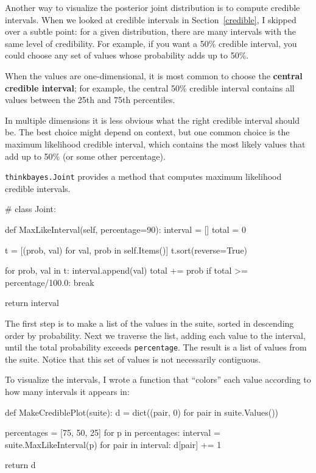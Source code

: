 \documentclass[12pt]{book}
\theoremstyle{exercise}
\begin{document}
Another way to visualize the posterior joint distribution is to
compute credible intervals.  When we looked at credible intervals
in Section~\ref{credible},
I skipped over a subtle point: for a given distribution, there
are many intervals with the same level of credibility.  For example,
if you want a 50\% credible interval, you could choose any set of
values whose probability adds up to 50\%.

When the values are one-dimensional, it is most common to choose
the {\bf central credible interval}; for example, the central 50\%
credible interval contains all values between the 25th and 75th
percentiles.

In multiple dimensions it is less obvious what the right credible
interval should be.  The best choice might depend on context, but
one common choice is the maximum likelihood credible interval, which
contains the most likely values that add up to 50\% (or some other
percentage).

{\tt thinkbayes.Joint} provides a method that computes maximum
likelihood credible intervals. 

\begin{code}
# class Joint:

    def MaxLikeInterval(self, percentage=90):
        interval = []
        total = 0

        t = [(prob, val) for val, prob in self.Items()]
        t.sort(reverse=True)

        for prob, val in t:
            interval.append(val)
            total += prob
            if total >= percentage/100.0:
                break

        return interval
\end{code}

The first step is to make a list of the values in the suite,
sorted in descending order by probability.  Next we traverse the
list, adding each value to the interval, until the total
probability exceeds {\tt percentage}.  The result is a list
of values from the suite.  Notice that this set of values
is not necessarily contiguous.

To visualize the intervals, I wrote a function that ``colors''
each value according to how many intervals it appears in:

\begin{code}
def MakeCrediblePlot(suite):
    d = dict((pair, 0) for pair in suite.Values())

    percentages = [75, 50, 25]
    for p in percentages:
        interval = suite.MaxLikeInterval(p)
        for pair in interval:
            d[pair] += 1

    return d
\end{code}
\end{document}
